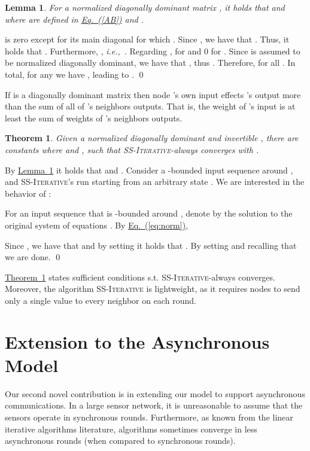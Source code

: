 \documentclass[preprint,12pt]{elsarticle}
\newtheorem{theorem}{Theorem}
\newtheorem{lemma}{Lemma}
\newenvironment{proof}{\noindent{\bf Proof:~~}}{}
\newcommand{\ie}{\emph{i.e.,\ }}
\newcommand{\namedref}[2]{\hyperref[#2]{#1~\ref*{#2}}}
\newcommand{\theoremref}[1]{\namedref{Theorem}{#1}}
\newcommand{\lemmaref}[1]{\namedref{Lemma}{#1}}
\newcommand{\namedrefeq}[2]{\hyperref[#2]{#1~\mbox{\rm(\ref*{#2})}}}
\newcommand{\equationref}[1]{\namedrefeq{Eq.}{#1}}
\newcommand{\syncAlg}{\textsc{SS-Iterative}\xspace}
\begin{document}
\begin{lemma}\label{claim:diag}
  For a normalized diagonally dominant matrix , it holds that
   and  where  are defined in \equationref{AB} and .
\end{lemma}
\begin{proof}
   is zero except for its
  main diagonal for which . Since , we have that . Thus, it holds that .
  Furthermore,
  , \ie . Regarding ,  for  and 0 for . Since  is assumed to be normalized diagonally dominant, we have
  that , thus . Therefore,  for all . In total, for any  we have
  , leading to .
\qed\end{proof}

If  is a diagonally dominant matrix then node 's own input effects 's output more than the sum of all of 's neighbors outputs. That is, the weight of 's input is at least the sum of weights of 's neighbors outputs.

\begin{theorem}\label{theorem:main}
  Given a normalized diagonally dominant and invertible , there are constants  where  and ,
  such that \syncAlg -always converges with
  .
\end{theorem}
\begin{proof}
  By \lemmaref{claim:diag} it holds that  and . Consider a -bounded input sequence  around , and
  \syncAlg's run starting from an arbitrary state .
  We are interested in the behavior of :

For an input sequence  that is -bounded around
, denote by  the solution to the original system of
equations . By \equationref{eq:norm},

  Since , we have that
   and by setting  it holds that . By setting  and recalling that  we are done.
\qed\end{proof}

\theoremref{theorem:main} states sufficient conditions s.t. \syncAlg -always
converges. Moreover, the algorithm \syncAlg is lightweight, as it
requires nodes to send only a single value to every neighbor on each
round.



\section{Extension to the Asynchronous Model}\label{sec:async}
Our second novel contribution is in extending our model to support
asynchronous communications. In a large sensor network, it is
unreasonable to assume that the sensors operate in synchronous
rounds. Furthermore, as known from the linear iterative algorithms
literature, algorithms
sometimes
converge in less asynchronous rounds (when compared to synchronous rounds).
\end{document}
